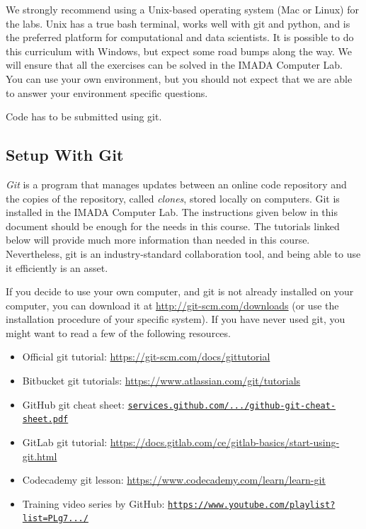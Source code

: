 \begin{warn}
We strongly recommend using a Unix-based operating system (Mac or Linux) for the labs.
Unix has a true bash terminal, works well with git and python, and is the preferred platform for computational and data scientists.
It is possible to do this curriculum with Windows, but expect some road bumps along the way. We will ensure that all the exercises can be solved in the IMADA Computer Lab. You can use your own environment, but you should not expect that we are able to answer your environment specific questions.
\end{warn}

Code has to be submitted using git. 

\subsection*{Setup With Git} %

\emph{Git} is a program that manages updates between an online code
repository and the copies of the repository, called \emph{clones},
stored locally on computers. Git is installed in the IMADA Computer
Lab. The instructions given below in this document should be enough for
the needs in this course. The tutorials linked below will provide much
more information than needed in this course. Nevertheless, git is an industry-standard collaboration tool, and being able to use it efficiently is an asset.

If you decide to use your own computer, and git is not already installed on your computer, you can download it at \url{http://git-scm.com/downloads} (or use the installation procedure of your specific system).
If you have never used git, you might want to read a few of the following resources.
\begin{itemize}
\item Official git tutorial: \url{https://git-scm.com/docs/gittutorial}
\item Bitbucket git tutorials: \url{https://www.atlassian.com/git/tutorials}
\item GitHub git cheat sheet: \href{https://services.github.com/on-demand/downloads/github-git-cheat-sheet.pdf}{\texttt{services.github.com/.../github-git-cheat-sheet.pdf}}
\item GitLab git tutorial: \url{https://docs.gitlab.com/ce/gitlab-basics/start-using-git.html}
\item Codecademy git lesson: \url{https://www.codecademy.com/learn/learn-git}
\item Training video series by GitHub: \href{https://www.youtube.com/playlist?list=PLg7s6cbtAD15G8lNyoaYDuKZSKyJrgwB-}{\texttt{https://www.youtube.com/playlist?list=PLg7.../}}
\end{itemize}

